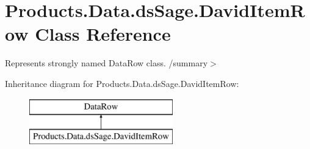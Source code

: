 \hypertarget{class_products_1_1_data_1_1ds_sage_1_1_david_item_row}{}\section{Products.\+Data.\+ds\+Sage.\+David\+Item\+Row Class Reference}
\label{class_products_1_1_data_1_1ds_sage_1_1_david_item_row}


Represents strongly named Data\+Row class. /summary$>$  


Inheritance diagram for Products.\+Data.\+ds\+Sage.\+David\+Item\+Row\+:\begin{figure}[H]
\begin{center}
\leavevmode
\includegraphics[height=2.000000cm]{class_products_1_1_data_1_1ds_sage_1_1_david_item_row}
\end{center}
\end{figure}
